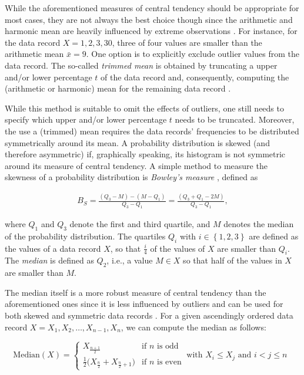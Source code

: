 While the aforementioned measures of central tendency should be appropriate for
most cases, they are not always the best choice though since the arithmetic
and harmonic mean are heavily influenced by extreme observations
\citep{shanmugam_statistics_2015}. 
For instance, for the data record $X = 1, 2, 3, 30$, three of four values are
smaller than the arithmetic mean $\bar{x} = 9$. One option is to explicitly exclude outlier
values from the data record. The so-called \emph{trimmed mean} is
obtained by truncating a upper and/or lower percentage $t$ of the data record
and, consequently, computing the (arithmetic or harmonic) mean for the remaining
data record \citep{shanmugam_statistics_2015}. 

While this method is suitable to omit the effects of outliers, one still needs to specify
which upper and/or lower percentage $t$ needs to be truncated. Moreover, the use
a (trimmed) mean requires the data records' frequencies to be distributed
symmetrically around its mean.
A probability distribution is skewed (and therefore asymmetric) if, graphically speaking, its histogram is not
symmetric around its measure of central tendency. A simple method to measure the
skewness of a probability distribution is \emph{Bowley's measure}
\citep{shanmugam_statistics_2015}, defined as

\begin{equation} \label{eq:bowley}
\begin{split}
B_S = \frac{(Q_3 - M) - (M - Q_1)}{Q_3 - Q_1} = \frac{(Q_3 + Q_1 - 2M)}{Q_3
- Q_1},
\end{split}
\end{equation}

where $Q_1$ and $Q_3$ denote the first and third quartile, and $M$ denotes the
median of the probability distribution. The quartiles $Q_i$ with $i \in \left\{
1,2,3 \right\}$ are defined as the values of a data record $X$, so that
$\frac{i}{4}$ of the values of $X$ are smaller than $Q_i$. The \emph{median} is
defined as $Q_2$, i.e., a value $M \in X$ so that half of the values in $X$ are smaller than $M$.

The median itself is a more robust measure of central tendency than the
aforementioned ones since it is less influenced by outliers and can be used for
both skewed and symmetric data records \citep{shanmugam_statistics_2015}. For a
given ascendingly ordered data record $X = X_1, X_2, \ldots, X_{n-1}, X_n$, we
can compute the median as follows:

\begin{equation} \label{eq:median}
\mathrm{Median}(X) = \begin{cases}
     X_{\frac{n+1}{2}} & \text{if $n$ is odd} \\
     \frac{1}{2}\big(X_{\frac{n}{2}} + X_{\frac{n}{2}+1}\big) & \text{if $n$ is
     even}
   \end{cases}~\text{with $X_i \leq X_j$ and $i < j \leq n$ }
\end{equation}

